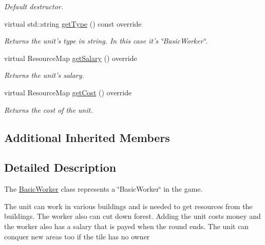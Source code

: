 \begin{DoxyCompactItemize}
\begin{DoxyCompactList}\small\item\em Default destructor. \end{DoxyCompactList}\item 
virtual std\-::string \hyperlink{class_course_1_1_basic_worker_a8396e00dafd128cbb86e479296d75c12}{get\-Type} () const override
\begin{DoxyCompactList}\small\item\em Returns the unit's type in string. In this case it's \char`\"{}\-Basic\-Worker\char`\"{}. \end{DoxyCompactList}\item 
virtual Resource\-Map \hyperlink{class_course_1_1_basic_worker_aa1659f8e78b68bb814496327f5ff2f81}{get\-Salary} () override
\begin{DoxyCompactList}\small\item\em Returns the unit's salary. \end{DoxyCompactList}\item 
virtual Resource\-Map \hyperlink{class_course_1_1_basic_worker_ad0f7393c8eee967e6d2ce4255bb366b0}{get\-Cost} () override
\begin{DoxyCompactList}\small\item\em Returns the cost of the unit. \end{DoxyCompactList}\end{DoxyCompactItemize}
\subsection*{Additional Inherited Members}


\subsection{Detailed Description}
The \hyperlink{class_course_1_1_basic_worker}{Basic\-Worker} class represents a \char`\"{}\-Basic\-Worker\char`\"{} in the game. 

The unit can work in various buildings and is needed to get resources from the buildings. The worker also can cut down forest. Adding the unit costs money and the worker also has a salary that is payed when the round ends. The unit can conquer new areas too if the tile has no owner 

